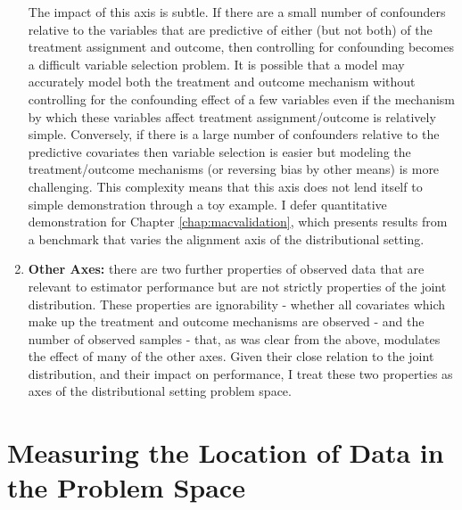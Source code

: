 \documentclass[../main.tex]{subfiles}
\begin{document}
\begin{enumerate}
\vspace{\baselineskip}

The impact of this axis is subtle. If there are a small number of confounders relative to the variables that are predictive of either (but not both) of the treatment assignment and outcome, then controlling for confounding becomes a difficult variable selection problem. It is possible that a model may accurately model both the treatment and outcome mechanism without controlling for the confounding effect of a few variables even if the mechanism by which these variables affect treatment assignment/outcome is relatively simple. Conversely, if there is a large number of confounders relative to the predictive covariates then variable selection is easier but modeling the treatment/outcome mechanisms (or reversing bias by other means) is more challenging. This complexity means that this axis does not lend itself to simple demonstration through a toy example. I defer quantitative demonstration for Chapter \ref{chap:macvalidation}, which presents results from a benchmark that varies the alignment axis of the distributional setting.


\vspace{\baselineskip}
	\item \textbf{Other Axes:} there are two further properties of observed data that are relevant to estimator performance but are not strictly properties of the joint distribution. These properties are ignorability - whether all covariates which make up the treatment and outcome mechanisms are observed - and the number of observed samples - that, as was clear from the above, modulates the effect of many of the other axes. Given their close relation to the joint distribution, and their impact on performance, I treat these two properties as axes of the distributional setting problem space.\par

\end{enumerate}

\section{Measuring the Location of Data in the Problem Space}
\end{document}
